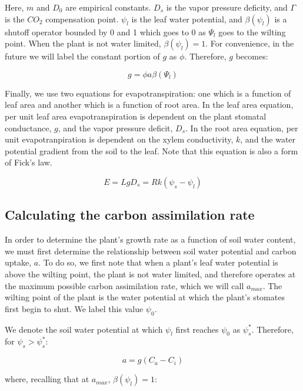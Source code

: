\documentclass{article}
\begin{document}
  Here, $m$ and $D_{0}$ are empirical constants. $D_{s}$ is the vapor pressure
  deficity, and $\Gamma$ is the $CO_{2}$ compensation point. $\psi_{l}$ is the leaf
  water potential, and $\beta(\psi_{l})$ is a shutoff operator bounded by 0 and
  1 which goes to 0 as $\Psi_{l}$ goes to the wilting point. When the plant is
  not water limited, $\beta(\psi_{l}) = 1$. For convenience, in the future we
  will label the constant portion of $g$ as $\phi$. Therefore, $g$ becomes:

  $$g = \phi a \beta(\Psi_{l})$$

  Finally, we use two equations for evapotranspiration: one which is a function
  of leaf area and another which is a function of root area. In the leaf
  area equation, per unit leaf area evapotranspiration is dependent on the plant
  stomatal conductance, $g$, and the vapor pressure deficit, $D_{s}$. In the
  root area equation, per unit evapotranpiration is dependent on the xylem
  conductivity, $k$, and the water potential gradient from the soil to the leaf.
  Note that this equation is also a form of Fick's law.

  \begin{equation} \label{eq:Evapotranspiration}
    E = LgD_{s} = Rk(\psi_{s} - \psi_{l})
  \end{equation}

  \subsection{Calculating the carbon assimilation rate} \label{calculating a}

  In order to determine the plant's growth rate as a function of soil
  water content, we must first determine the relationship between soil water potential
  and carbon uptake, $a$. To do so, we first note that when a plant's leaf water
  potential is above the wilting point, the plant is not water limited, and
  therefore operates at the maximum possible carbon assimilation rate, which
  we will call $a_{max}$. The wilting point of the plant is the water potential at which
  the plant's stomates first begin to shut. We label this value $\psi_{0}$.

  We denote the soil water potential at which $\psi_{l}$ first reaches
  $\psi_{0}$ as $\psi_{s}^{*}$. Therefore, for $\psi_{s} > \psi_{s}^{*}$:

  $$a = g(C_{a} - C_{i})$$

  where, recalling that at $a_{max}$, $ \beta(\psi_{l}) = 1 $:
\end{document}
